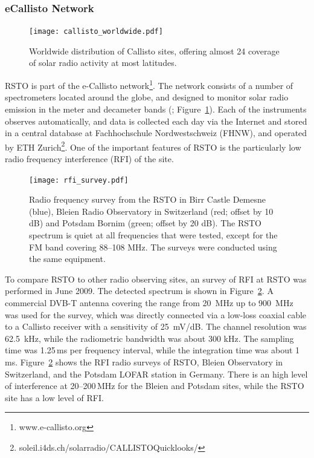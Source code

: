 \subsubsection{eCallisto Network}
\begin{figure}[!t]
\begin{center}
\texttt{[image: callisto\_worldwide.pdf]}
\caption[Callisto Worldwide]{Worldwide distribution of Callisto sites, offering almost 24 coverage of solar radio activity at most latitudes.}
\label{fig:callisto_worldwide}
\end{center}
\end{figure}
RSTO is part of the e-Callisto network\footnote{www.e-callisto.org}. The network consists of a number of spectrometers located around the globe, and designed to monitor solar radio emission in the meter and decameter bands (\citealt{Benz2009}; Figure~\ref{fig:callisto_worldwide}).  Each of the instruments observes automatically, and data is collected each day via the Internet and stored in a central database at Fachhochschule Nordwestschweiz (FHNW), and operated by ETH Zurich\footnote{soleil.i4ds.ch/solarradio/CALLISTOQuicklooks/}. One of the important features of RSTO is the particularly low radio frequency interference (RFI) of the site. 
\begin{figure}[!t]
\begin{center}
\texttt{[image: rfi\_survey.pdf]}
\caption[RSTO RFI Survey]{Radio frequency survey from the RSTO in Birr Castle Demesne (blue), Bleien Radio Observatory in Switzerland (red; offset by 10 dB) and Potsdam Bornim (green; offset by 20 dB). The RSTO spectrum is quiet at all frequencies that were tested, except for the FM band covering 88--108 MHz. The surveys were conducted using the same equipment.}
\label{fig:rfi_survey}
\end{center}
\end{figure}

To compare RSTO to other radio observing sites, an survey of RFI at RSTO was performed in June 2009. The detected spectrum is shown in Figure~\ref{fig:rfi_survey}.  A commercial DVB-T antenna covering the range from 20~MHz up to 900~MHz was used for the survey, which was directly connected via a low-loss coaxial cable to a Callisto receiver with a sensitivity of 25~mV/dB. The channel resolution was 62.5~kHz, while the radiometric bandwidth was about 300 kHz. The sampling time was 1.25\,ms per frequency interval, while the integration time was about 1\,ms.  Figure~\ref{fig:rfi_survey} shows the RFI radio surveys of RSTO, Bleien Observatory in Switzerland, and the Potsdam LOFAR station in Germany. There is an high level of interference at 20--200\,MHz for the Bleien and Potsdam sites, while the RSTO site has a low level of RFI.

